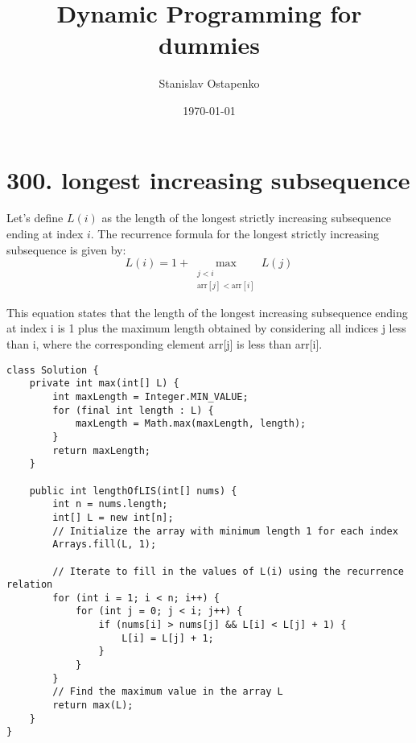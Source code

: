 \documentclass{article}
\begin{document}
    \title{Dynamic Programming for dummies}
    \author{Stanislav Ostapenko}
    \date{\today}
    \maketitle

    \section*{300. longest increasing subsequence}
    Let's define $L(i)$ as the length of the longest strictly increasing subsequence ending at index $i$.
    The recurrence formula for the longest strictly increasing subsequence is given by:
    \[ L(i) = 1 + \max_{\substack{j < i \\ \text{arr}[j] < \text{arr}[i]}} L(j) \]

	This equation states that the length of the longest increasing subsequence ending at index i is 1 plus the maximum length obtained by considering all indices j less than i, where the corresponding element arr[j] is less than arr[i].
	
    \lstset{language=Java}
\begin{lstlisting}
class Solution {
	private int max(int[] L) {
		int maxLength = Integer.MIN_VALUE;
		for (final int length : L) {
			maxLength = Math.max(maxLength, length);
		}
		return maxLength;
	}
	
	public int lengthOfLIS(int[] nums) {
		int n = nums.length;
		int[] L = new int[n];
		// Initialize the array with minimum length 1 for each index
		Arrays.fill(L, 1);
		
		// Iterate to fill in the values of L(i) using the recurrence relation
		for (int i = 1; i < n; i++) {
			for (int j = 0; j < i; j++) {
				if (nums[i] > nums[j] && L[i] < L[j] + 1) {
					L[i] = L[j] + 1;
				}
			}
		}
		// Find the maximum value in the array L
		return max(L);
	}
}
\end{lstlisting}
\end{document}
